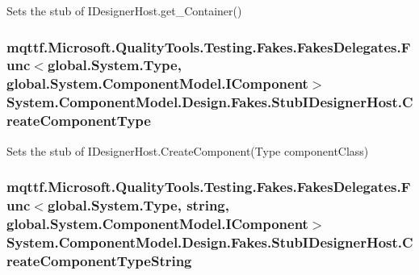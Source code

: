 Sets the stub of I\-Designer\-Host.\-get\-\_\-\-Container()

\hypertarget{class_system_1_1_component_model_1_1_design_1_1_fakes_1_1_stub_i_designer_host_a24c0a570468f4972e8902bada1ec19e8}{
\subsubsection[{Create\-Component\-Type}]{\setlength{\rightskip}{0pt plus 5cm}mqttf.\-Microsoft.\-Quality\-Tools.\-Testing.\-Fakes.\-Fakes\-Delegates.\-Func$<$global.\-System.\-Type, global.\-System.\-Component\-Model.\-I\-Component$>$ System.\-Component\-Model.\-Design.\-Fakes.\-Stub\-I\-Designer\-Host.\-Create\-Component\-Type}}\label{class_system_1_1_component_model_1_1_design_1_1_fakes_1_1_stub_i_designer_host_a24c0a570468f4972e8902bada1ec19e8}


Sets the stub of I\-Designer\-Host.\-Create\-Component(\-Type component\-Class)

\hypertarget{class_system_1_1_component_model_1_1_design_1_1_fakes_1_1_stub_i_designer_host_a3bd9c9ec66339f4ee632848a325f2815}{
\subsubsection[{Create\-Component\-Type\-String}]{\setlength{\rightskip}{0pt plus 5cm}mqttf.\-Microsoft.\-Quality\-Tools.\-Testing.\-Fakes.\-Fakes\-Delegates.\-Func$<$global.\-System.\-Type, string, global.\-System.\-Component\-Model.\-I\-Component$>$ System.\-Component\-Model.\-Design.\-Fakes.\-Stub\-I\-Designer\-Host.\-Create\-Component\-Type\-String}}\label{class_system_1_1_component_model_1_1_design_1_1_fakes_1_1_stub_i_designer_host_a3bd9c9ec66339f4ee632848a325f2815}


